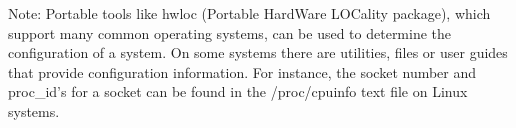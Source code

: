 Note: Portable tools like hwloc (Portable HardWare LOCality package), which support
many common operating systems, can be used to determine the configuration of a system.  
On some systems there are utilities, files or user guides that provide configuration
information.  For instance, the socket number and proc\_id's for a socket 
can be found in the /proc/cpuinfo text file on Linux systems.



